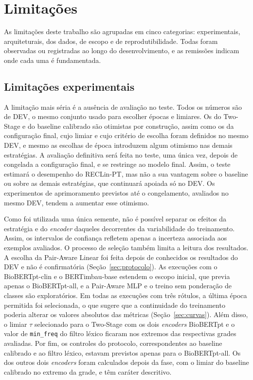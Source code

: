 \section{Limitações}
\label{sec:limitacoes}

As limitações deste trabalho são agrupadas em cinco categorias: experimentais,
arquiteturais, dos dados, de escopo e de reprodutibilidade. Todas foram observadas
ou registradas ao longo do desenvolvimento, e as remissões indicam onde cada uma é
fundamentada.

\subsection{Limitações experimentais}

A limitação mais séria é a ausência de avaliação no teste. Todos os números são de
DEV, o mesmo conjunto usado para escolher épocas e limiares. Os do Two-Stage e do
baseline calibrado são otimistas por construção, assim como os da configuração
final, cujo limiar e cujo critério de escolha foram definidos no mesmo DEV, e mesmo
as escolhas de época introduzem algum otimismo nas demais estratégias. A avaliação definitiva será feita no teste, uma única vez, depois de congelada a configuração final, e se restringe ao modelo final. Assim, o teste estimará o desempenho do
RECLin-PT, mas não a sua vantagem sobre o baseline ou sobre as demais estratégias,
que continuará apoiada só no DEV. Os experimentos de aprimoramento previstos até o
congelamento, avaliados no mesmo DEV, tendem a aumentar esse otimismo.

Como foi utilizada uma única semente, não é possível separar os efeitos da estratégia e do \emph{encoder} daqueles decorrentes da variabilidade do treinamento. Assim, os intervalos de confiança refletem apenas a incerteza associada aos exemplos avaliados. O processo de seleção também limita a leitura dos
resultados. A escolha da Pair-Aware Linear foi feita depois de conhecidos os resultados do DEV
e não é confirmatória (Seção~\ref{sec:protocolo}). As execuções com o BioBERTpt-clin
e o BERTimbau-base estendem o escopo inicial, que previa apenas o BioBERTpt-all, e a
Pair-Aware MLP e o treino sem ponderação de classes são exploratórios.
Em todas as execuções com três rótulos, a última época permitida foi selecionada, o que sugere que a continuidade do treinamento poderia alterar os valores absolutos das métricas (Seção~\ref{sec:curvas}). Além disso, o limiar $\tau$ selecionado para o Two-Stage com os dois \emph{encoders} BioBERTpt e o valor de \texttt{min\_freq} do filtro léxico ficaram nos extremos das respectivas grades avaliadas. Por fim, os controles do protocolo, correspondentes ao baseline calibrado e ao filtro léxico, estavam previstos apenas para o BioBERTpt-all. Os dos outros dois \emph{encoders} foram calculados depois da fase, com o limiar do baseline calibrado no extremo da grade, e têm caráter descritivo.

